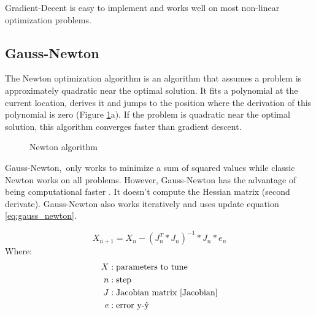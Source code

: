\documentclass[11pt,a4paper,titlepage,oneside]{report}
\begin{document}
Gradient-Decent is easy to implement and works well on most non-linear optimization problems.

\subsection{Gauss-Newton}
The Newton optimization algorithm is an algorithm that assumes a problem is approximately quadratic near the optimal solution. It fits a polynomial at the current location, derives it and jumps to the position where the derivation of this polynomial is zero (Figure \ref{fig:newton}a). If the problem is quadratic near the optimal solution, this algorithm converges faster than gradient descent.

\begin{figure}[H]
	\centering
	\qquad
	\caption{Newton algorithm}
	\label{fig:newton}
\end{figure}

Gauss-Newton, only works to minimize a sum of squared values while classic Newton works on all problems. However, Gauss-Newton has the advantage of being computational faster \cite{gauss_newton}. It doesn't compute the Hessian matrix (second derivate). Gauss-Newton also works iteratively and uses update equation \ref{eq:gauss_newton}. 

\begin{equation}\label{eq:gauss_newton}
  X_{n+1} = X_n - (J_n^T*J_n)^{-1}*J_n*e_n
\end{equation}
Where:
\begin{align*}
  X		  &: \text{parameters to tune}\\
  n		  &: \text{step}\\
	J		  &: \text{Jacobian matrix \cite{Jacobian}}\\
  e  	  &: \text{error y-ŷ}
\end{align*}
\end{document}
